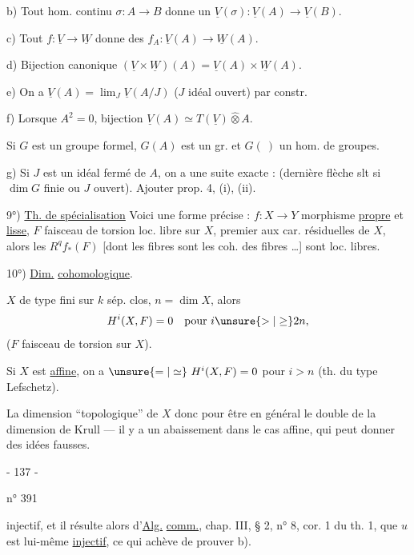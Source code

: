 b) Tout hom. continu $\sigma:A\longrightarrow B$ donne un $\underline V(\sigma):\underline V(A)\longrightarrow\underline V(B)$.

c) Tout $f:\underline V\longrightarrow\underline W$ donne des $f_A:\underline V(A)\longrightarrow\underline W(A)$.

d) Bijection canonique $(\underline V\times\underline W)(A)=\underline V(A)\times\underline W(A)$.

e) On a $\underline V(A)=\lim_J\underline V(A/J)$ ($J$ idéal ouvert) par constr.

f) Lorsque $A^2=0$, bijection $\underline V(A)\simeq T(\underline V)\mathbin{\widehat\otimes} A$.

Si $G$ est un groupe formel, $G(A)$ est un gr. et $G(\ )$ un hom. de groupes.

g) Si $J$ est un idéal fermé de $A$, on a une suite exacte :
(dernière flèche slt si $\dim G$ finie ou $J$ ouvert). Ajouter prop. 4, (i), (ii).

9°) \uline{Th. de spécialisation} Voici  une forme précise : $f:X\longrightarrow Y$ morphisme \uline{propre} et \uline{lisse}, $F$ faisceau de torsion loc. libre sur $X$, premier aux car. résiduelles de $X$, alors les $R^q f_*(F)$ [dont les fibres sont les coh. des fibres \ldots] sont loc. libres.

10°) \uline{Dim.} \uline{cohomologique}.

$X$ de type fini sur $k$ sép. clos, $n=\dim X$, alors
\[
H^i(X,F)=0\quad\text{pour }i\unsure{>|\geq}2n,
\]
($F$ faisceau de torsion sur $X$).

Si $X$ est \uline{affine}, on a $\unsure{=|\simeq}\ H^i(X,F)=0$ pour $i>n$ (th. du type Lefschetz).

La dimension ``topologique'' de $X$  donc pour être en général le double de la dimension de Krull --- il y a un abaissement dans le cas affine, qui peut donner des idées fausses.

\begin{center}- 137 -\end{center}
\hfill n° 391

injectif, et il résulte alors d'\uline{Alg.} \uline{comm.}, chap. III, § 2, n° 8, cor. 1 du th. 1, que $u$ est lui-même \uline{injectif}, ce qui achève de prouver b).

